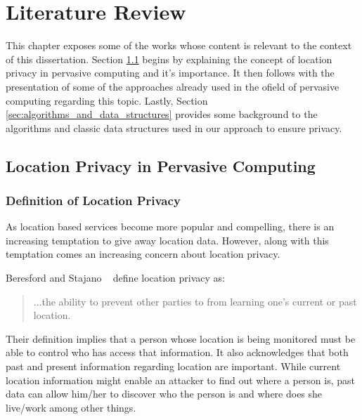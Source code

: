 \chapter{Literature Review}
\label{chap:literature_review}

This chapter exposes some of the works whose content is relevant to
the context of this dissertation. Section
\ref{sec:privacy_pervasive_computing} begins by explaining the concept
of location privacy in pervasive computing and it's importance. It then follows
with the presentation of some of the approaches already used in the
ofield of pervasive computing regarding this topic. Lastly, Section
\ref{sec:algorithms_and_data_structures} provides some background to
the algorithms and classic data structures used in our approach to ensure
privacy.
\section{Location Privacy in Pervasive Computing}
\label{sec:privacy_pervasive_computing}

\subsection{Definition of Location Privacy}
\label{sec:definition_privacy}
As location based services become more popular and compelling, there
is an increasing temptation to give away location data. However, along
with this temptation comes an increasing concern about location
privacy.

Beresford and Stajano ~\cite{1186725} define location privacy as:
\begin{quotation}
  ...the ability to prevent other parties to from learning one's
  current or past location.
\end{quotation}
Their definition implies that a person whose location is being
monitored must be able to control who has access that information.
It also acknowledges that both past and present information regarding location
are important. While current location information might enable an
attacker to find out where a person is, past data can allow him/her to
discover who the person is and where does she live/work among other
things.

